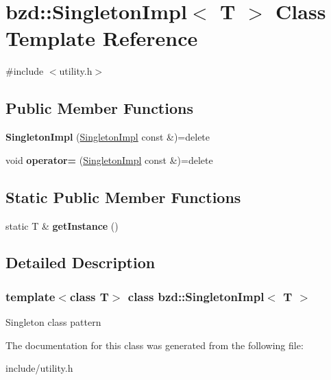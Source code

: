 \hypertarget{classbzd_1_1SingletonImpl}{}\section{bzd\+:\+:Singleton\+Impl$<$ T $>$ Class Template Reference}
\label{classbzd_1_1SingletonImpl}


{\ttfamily \#include $<$utility.\+h$>$}

\subsection*{Public Member Functions}
\begin{DoxyCompactItemize}
\item 
\mbox{\label{classbzd_1_1SingletonImpl_a1ef3353e55169dc44b818bf5669d9877}} 
{\bfseries Singleton\+Impl} (\hyperlink{classbzd_1_1SingletonImpl}{Singleton\+Impl} const \&)=delete
\item 
\mbox{\label{classbzd_1_1SingletonImpl_a0fb4c26dc96ce6e863590c1b1eb01765}} 
void {\bfseries operator=} (\hyperlink{classbzd_1_1SingletonImpl}{Singleton\+Impl} const \&)=delete
\end{DoxyCompactItemize}
\subsection*{Static Public Member Functions}
\begin{DoxyCompactItemize}
\item 
\mbox{\label{classbzd_1_1SingletonImpl_a4a475422493c060633aae09c29d34079}} 
static T \& {\bfseries get\+Instance} ()
\end{DoxyCompactItemize}


\subsection{Detailed Description}
\subsubsection*{template$<$class T$>$\newline
class bzd\+::\+Singleton\+Impl$<$ T $>$}

Singleton class pattern 

The documentation for this class was generated from the following file\+:\begin{DoxyCompactItemize}
\item 
include/utility.\+h\end{DoxyCompactItemize}
